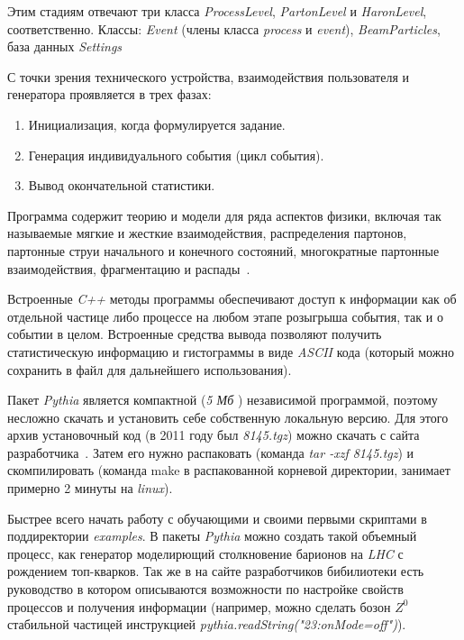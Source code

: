 Этим стадиям отвечают три класса \textit{ProcessLevel},
\textit{PartonLevel} и \textit{HaronLevel}, соответственно. Классы: \textit{Event}
(члены класса \textit{process} и \textit{event}), \textit{BeamParticles}, база данных
\textit{Settings}

С точки зрения технического устройства,
взаимодействия пользователя и генератора проявляется в
трех фазах:


\begin{enumerate}
	\item Инициализация, когда формулируется задание.
	\item Генерация индивидуального события (цикл события).
	\item Вывод окончательной статистики.
\end{enumerate}

Программа содержит теорию и модели для ряда
аспектов физики, включая так называемые мягкие и жесткие
взаимодействия, распределения партонов, партонные струи
начального и конечного состояний, многократные
партонные взаимодействия, фрагментацию и распады~\cite{review-pythia}.

Встроенные \textit{C++} методы программы обеспечивают
доступ к информации как об отдельной частице либо
процессе на любом этапе розыгрыша события, так и о
событии в целом. Встроенные средства вывода позволяют
получить статистическую информацию и гистограммы в
виде \textit{ASCII} кода (который можно сохранить в файл для
дальнейшего использования).

Пакет \textit{Pythia} является компактной (\textit{5 Мб} )
независимой программой, поэтому несложно скачать и
установить себе собственную локальную версию. Для этого
архив установочный код (в 2011 году был \textit{8145.tgz}) можно
скачать с сайта разработчика~\cite{review-pythia}.
Затем его нужно распаковать (команда \textit{tar -xzf 8145.tgz})
и скомпилировать (команда make в распакованной корневой
директории, занимает примерно 2 минуты на \textit{linux}).

Быстрее всего начать работу с обучающими и своими
первыми скриптами в поддиректории \textit{examples}. В пакеты \textit{Pythia} можно создать такой объемный процесс, как генератор
моделирющий столкновение барионов на \textit{LHC} с рождением
топ-кварков. Так же в на сайте разработчиков бибилиотеки есть руководство в котором описываются возможности по настройке
свойств процессов и получения информации (например,
можно сделать бозон ${Z}^0$ стабильной частицей инструкцией \textit{pythia.readString("23:onMode=off")}). 

